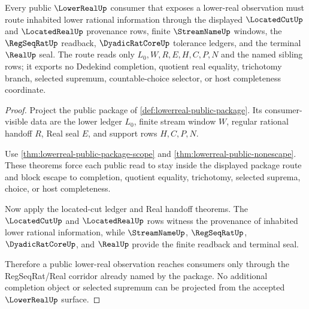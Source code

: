 \begin{theorem}
\label{thm:lower-real-public-regseqrat-real-route}
Every public $\LowerRealUp$ consumer that exposes a lower-real observation must route inhabited lower rational information through the displayed $\LocatedCutUp$ and $\LocatedRealUp$ provenance rows, finite $\StreamNameUp$ windows, the $\RegSeqRatUp$ readback, $\DyadicRatCoreUp$ tolerance ledgers, and the terminal $\RealUp$ seal. The route reads only $L_0,W,R,E,H,C,P,N$ and the named sibling rows; it exports no Dedekind completion, quotient real equality, trichotomy branch, selected supremum, countable-choice selector, or host completeness coordinate.
\end{theorem}
\begin{proof}
Project the public package of \autoref{def:lowerreal-public-package}. Its consumer-visible data are the lower ledger $L_0$, finite stream window $W$, regular rational handoff $R$, Real seal $E$, and support rows $H,C,P,N$.

Use \autoref{thm:lowerreal-public-package-scope} and \autoref{thm:lowerreal-public-nonescape}. These theorems force each public read to stay inside the displayed package route and block escape to completion, quotient equality, trichotomy, selected suprema, choice, or host completeness.

Now apply the located-cut ledger and Real handoff theorems. The $\LocatedCutUp$ and $\LocatedRealUp$ rows witness the provenance of inhabited lower rational information, while $\StreamNameUp$, $\RegSeqRatUp$, $\DyadicRatCoreUp$, and $\RealUp$ provide the finite readback and terminal seal.

Therefore a public lower-real observation reaches consumers only through the RegSeqRat/Real corridor already named by the package. No additional completion object or selected supremum can be projected from the accepted $\LowerRealUp$ surface.
\end{proof}

